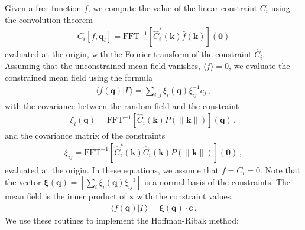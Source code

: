\documentclass[a4paper, 11pt]{article}
\begin{document}
Given a free function $f$, we compute the value of the linear constraint $C_i$ using the convolution theorem
\begin{align}
C_i[f,\bm{q}_i]=\text{FFT}^{-1}[\hat{C}_i^*(\bm{k}) \hat{f}(\bm{k})](\bm{0})
\end{align}
evaluated at the origin, with the Fourier transform of the constraint $\hat{C}_i$. Assuming that the unconstrained mean field vanishes, $\langle f \rangle =0$, we evaluate the constrained mean field using the formula
\begin{align}
\langle f(\bm{q}) | \Gamma\rangle = \sum_{i,j} \xi_i(\bm{q})\xi_{ij}^{-1} c_j\,,
\end{align}
with the covariance between the random field and the constraint
\begin{align}
\xi_i(\bm{q}) = \text{FFT}^{-1}[\hat{C}_i(\bm{k}) P(\|\bm{k}\|)](\bm{q})\,,
\end{align}
and the covariance matrix of the constraints
\begin{align}
\xi_{ij}=\text{FFT}^{-1}[\hat{C}_i^*(\bm{k}) \hat{C}_i(\bm{k}) P(\|\bm{k}\|)](\bm{0})\,,
\end{align}
evaluated at the origin. In these equations, we assume that $\bar{f}=\bar{C}_i=0$. Note that the vector $\bm{\xi}(\bm{q})=[\sum_i \xi_i(\bm{q}) \xi_{ij}^{-1}]$ is a normal basis of the constraints. The mean field is the inner product of $\bm{x}$ with the constraint values, 
\begin{align}
\langle f(\bm{q}) | \Gamma\rangle = \bm{\xi}(\bm{q})\cdot \bm{c}\,.
\end{align}
We use these routines to implement the Hoffman-Ribak method:\\
\end{document}
